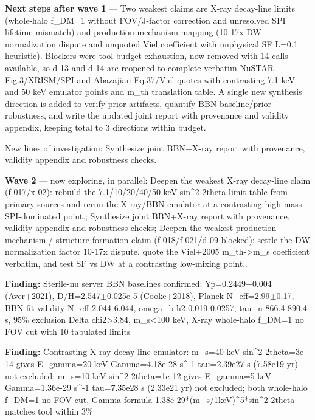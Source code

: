 \documentclass[11pt,a4paper]{article}
\begin{document}
\textbf{Next steps after wave 1} --- Two weakest claims are X-ray decay-line limits (whole-halo f\_DM=1 without FOV/J-factor correction and unresolved SPI lifetime mismatch) and production-mechanism mapping (10-17x DW normalization dispute and unquoted Viel coefficient with unphysical SF L=0.1 heuristic). Blockers were tool-budget exhaustion, now removed with 14 calls available, so d-13 and d-14 are reopened to complete verbatim NuSTAR Fig.3/XRISM/SPI and Abazajian Eq.37/Viel quotes with contrasting 7.1 keV and 50 keV emulator points and m\_th translation table. A single new synthesis direction is added to verify prior artifacts, quantify BBN baseline/prior robustness, and write the updated joint report with provenance and validity appendix, keeping total to 3 directions within budget.

New lines of investigation: Synthesize joint BBN+X-ray report with provenance, validity appendix and robustness checks.

\textbf{Wave 2} --- now exploring, in parallel: Deepen the weakest X-ray decay-line claim (f-017/x-02): rebuild the 7.1/10/20/40/50 keV sin\textasciicircum{}2 2theta limit table from primary sources and rerun the X-ray/BBN emulator at a contrasting high-mass SPI-dominated point.; Synthesize joint BBN+X-ray report with provenance, validity appendix and robustness checks; Deepen the weakest production-mechanism / structure-formation claim (f-018/f-021/d-09 blocked): settle the DW normalization factor 10-17x dispute, quote the Viel+2005 m\_th-\textgreater{}m\_s coefficient verbatim, and test SF vs DW at a contrasting low-mixing point..

\textbf{Finding:} Sterile-nu server BBN baselines confirmed: Yp=0.2449$\pm$0.004 (Aver+2021), D/H=2.547$\pm$0.025e-5 (Cooke+2018), Planck N\_eff=2.99$\pm$0.17, BBN fit validity N\_eff 2.044-6.044, omega\_b h2 0.019-0.0257, tau\_n 866.4-890.4 s, 95\% exclusion Delta chi2\textgreater{}3.84, m\_s\textless{}100 keV, X-ray whole-halo f\_DM=1 no FOV cut with 10 tabulated limits

\textbf{Finding:} Contrasting X-ray decay-line emulator: m\_s=40 keV sin\textasciicircum{}2 2theta=3e-14 gives E\_gamma=20 keV Gamma=4.18e-28 s\textasciicircum{}-1 tau=2.39e27 s (7.58e19 yr) not excluded; m\_s=10 keV sin\textasciicircum{}2 2theta=1e-12 gives E\_gamma=5 keV Gamma=1.36e-29 s\textasciicircum{}-1 tau=7.35e28 s (2.33e21 yr) not excluded; both whole-halo f\_DM=1 no FOV cut, Gamma formula 1.38e-29*(m\_s/1keV)\textasciicircum{}5*sin\textasciicircum{}2 2theta matches tool within 3\%
\end{document}
